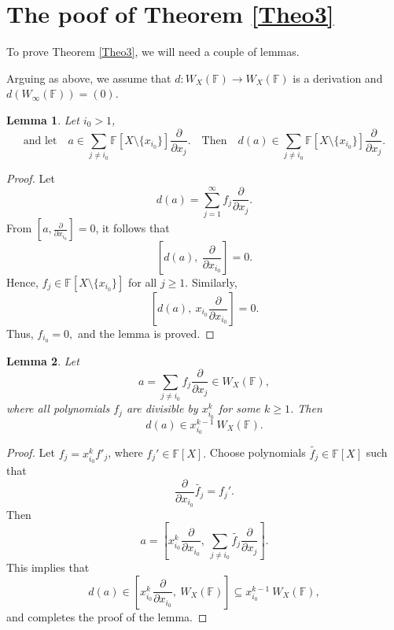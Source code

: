 \documentclass[12pt,a4paper]{amsart}
\theoremstyle{plain}
\newtheorem{Lemma}{Lemma}
\begin{document}
	
	
	\section{The poof of Theorem \ref{Theo3}}
	
	To prove Theorem \ref{Theo3}, we will need a couple of lemmas. 
	
	Arguing as above, we assume that $d:W_X (\mathbb{F}) \to W_X (\mathbb{F})$ is a derivation and $d(W_{\infty}(\mathbb{F}))=(0).$
	\begin{Lemma}\label{Lemma12} Let \( i_0 > 1 \), 
		\[ \text{and let} \quad 
		a \in \sum_{j \neq i_0} \mathbb{F}[X \setminus \{x_{i_0}\}] \frac{\partial}{\partial x_j}. \quad \text{Then} \quad   d(a) \in \sum_{j \neq i_0} \mathbb{F}[X \setminus \{x_{i_0}\}] \frac{\partial}{\partial x_j} .\]
	\end{Lemma}
	
	\begin{proof} Let 
		\[
		d(a) = \sum_{j=1}^{\infty} f_j \frac{\partial}{\partial x_j}.
		\]
		From \( [a, \frac{\partial}{\partial x_{i_0}}] = 0 \), it follows that
		\[
		\left[d(a), \ \frac{\partial}{\partial x_{i_0}}\right] = 0. \] Hence, $ f_j \in \mathbb{F}\left[X \setminus \{x_{i_0}\}\right]$ for all $ j \geq 1.$
		Similarly, 
		\[
		\left[d(a), \ x_{i_0} \frac{\partial}{\partial x_{i_0}}\right] = 0 .\] Thus, $f_{i_0} = 0,$ and the lemma is proved.  \end{proof}
	
	
	\begin{Lemma}\label{Lemma13} Let \[ a = \sum_{j \neq i_0} f_j \frac{\partial}{\partial x_j} \in W_X(\mathbb{F}), \] where all polynomials  \( f_j \) are divisible by \( x_{i_0}^k \) for some \( k \geq 1 \). Then 
		\[
		d(a) \in x_{i_0}^{k-1} \ W_X(\mathbb{F}).
		\] \end{Lemma}
	
	\begin{proof} Let \( f_j = x_{i_0}^k f'_j \), where \( f_j' \in \mathbb{F}[X] .\) Choose polynomials \( \widetilde{f_j} \in \mathbb{F}[X] \)  such that 
		$$\frac{\partial}{\partial x_{i_0}} \widetilde{f_j} = f_j' .$$ Then 
		\[
		a = \left[x_{i_0}^k \frac{\partial}{\partial x_{i_0}}  , \ \sum_{j \neq i_0} \widetilde{f_j} \frac{\partial}{\partial x_j}\right].
		\]
		This implies that
		\[
		d(a) \in  \left[x_{i_0}^k \frac{\partial}{\partial x_{i_0}}  , \ W_X(\mathbb{F})\right] \subseteq x_{i_0}^{k-1} \ W_X(\mathbb{F}),
		\]
		and completes the proof of the lemma. \end{proof}
	
\end{document}
